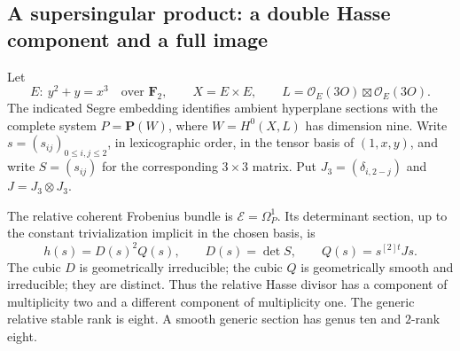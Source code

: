 \subsection{A supersingular product: a double Hasse component and a full image}
\label{subsec:supersingular-product-degree-one}

Let
\[
 E:\ y^2+y=x^3\quad\text{over }\mathbf F_2,
 \qquad X=E\times E,\qquad
 L=\mathcal O_E(3O)\boxtimes\mathcal O_E(3O).
\]
The indicated Segre embedding identifies ambient hyperplane sections with
the complete system $P=\mathbf P(W)$, where $W=H^0(X,L)$ has dimension nine.
Write $s=(s_{ij})_{0\le i,j\le2}$, in lexicographic order, in the tensor
basis of $(1,x,y)$, and write $S=(s_{ij})$ for the corresponding
$3\times3$ matrix. Put $J_3=(\delta_{i,2-j})$ and $J=J_3\otimes J_3$.

\begin{proposition}
\label{prop:ss-product-relative-Hasse}
The relative coherent Frobenius bundle is $\mathcal E=\Omega^1_P$.
Its determinant section, up to the constant trivialization implicit in
the chosen basis, is
\begin{equation}\label{eq:ss-product-Hasse-factorization}
 h(s)=D(s)^2Q(s),\qquad
 D(s)=\det S,\qquad Q(s)=s^{[2]t}Js.
\end{equation}
The cubic $D$ is geometrically irreducible; the cubic $Q$ is
geometrically smooth and irreducible; they are distinct. Thus the
relative Hasse divisor has a component of multiplicity two and a
different component of multiplicity one. The generic relative stable
rank is eight. A smooth generic section has genus ten and $2$-rank eight.
\end{proposition}

